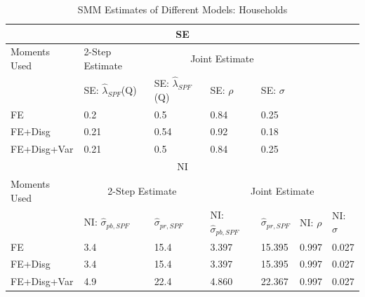 \documentclass[12pt]{article}
\begin{document}
\begin{table}[p]
	\caption{SMM Estimates of Different Models: Households}
	\label{SMM_Est_SCE}
	\begin{tabular}{lllllll}
		\hline 
		\multicolumn{7}{c}{SE}                                                               
		                                                      \\
		                                          \hline 
		Moments Used & 2-Step Estimate            & \multicolumn{3}{c}{Joint Estimate}                                                 &            &              \\
		\hline 
		& SE: $\hat\lambda_{SPF}$(Q) & SE: $\hat\lambda_{SPF}$(Q) & SE: $\rho$                & SE: $\sigma$              &            &              \\
			\hline   
		FE        & 0.2                        & 0.5                        & 0.84                      & 0.25                      &            &              \\
		FE+Disg      & 0.21                       & 0.54                       & 0.92                      & 0.18                      &            &              \\
		FE+Disg+Var  & 0.21                       & 0.5                        & 0.84                      & 0.25                      &            &              \\
			\hline   
		\multicolumn{7}{c}{NI}                                                                                                                                   \\
			\hline   
		Moments Used & \multicolumn{2}{c}{2-Step Estimate}                     & \multicolumn{4}{c}{Joint Estimate}                                                \\
		\hline 
		& NI: $\hat\sigma_{pb,SPF}$  & $\hat\sigma_{pr,SPF}$      & NI: $\hat\sigma_{pb,SPF}$ & $\hat\sigma_{pr,SPF}$     & NI: $\rho$ & NI: $\sigma$ \\
		\hline 
		FE        & 3.4                        & 15.4                       & 3.397                     & 15.395                    & 0.997      & 0.027        \\
		FE+Disg      & 3.4                        & 15.4                       & 3.397                     & 15.395                    & 0.997      & 0.027        \\
		FE+Disg+Var  & 4.9                        & 22.4                       & 4.860                     & 22.367                    & 0.997      & 0.027        \\

\end{tabular}
\end{table}
\end{document}
